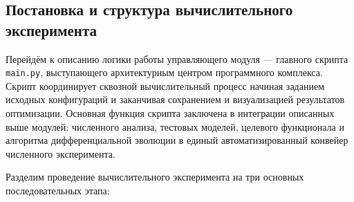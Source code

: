 \subsection{Постановка и структура вычислительного эксперимента}
Перейдём к описанию логики работы управляющего модуля — главного скрипта \texttt{main.py}, выступающего архитектурным центром программного комплекса. Скрипт координирует сквозной вычислительный процесс начиная заданием исходных конфигураций и заканчивая сохранением и визуализацией результатов оптимизации. Основная функция скрипта заключена в интеграции описанных выше модулей: численного анализа, тестовых моделей, целевого функционала и алгоритма дифференциальной эволюции в единый автоматизированный конвейер численного эксперимента. 

Разделим проведение вычислительного эксперимента на три основных последовательных этапа:
